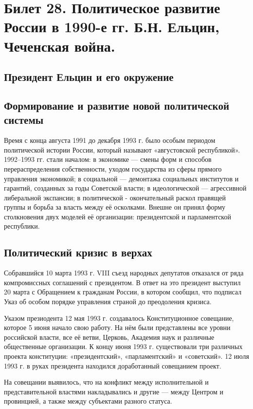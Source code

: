 \section{Билет 28. Политическое развитие России в 1990-е гг. Б.Н. Ельцин, Чеченская война.}

\subsection{Президент Ельцин и его окружение}

\subsection{Формирование и развитие новой политической системы}

Время с конца августа 1991 до декабря 1993 г. было особым периодом политической истории России, который называют «августовской республикой». 1992–1993 гг. стали началом: в экономике — смены форм и способов перераспределения собственности, уходом государства из сферы прямого управления экономикой; в социальной — демонтажа социальных институтов и гарантий, созданных за годы Советской власти; в идеологической — агрессивной либеральной экспансии; в политической - окончательный раскол правящей группы и борьба за власть между её осколками. Внешне он принял форму столкновения двух моделей её организации: президентской и парламентской республики.

\subsection{Политический кризис в верхах}

Собравшийся 10 марта 1993 г. VIII съезд народных депутатов отказался от ряда компромиссных соглашений с президентом. В ответ на это президент выступил 20 марта с Обращением к гражданам России, в котором сообщил, что подписал Указ об особом порядке управления страной до преодоления кризиса.

Указом презиодента 12 мая 1993 г. создавалось Конституционное совещание, которое 5 июня начало свою работу. На нём были представлены все уровни российской власти, все её ветви, Церковь, Академия наук и различные общественные организации. К концу июня 1993 г. существовали три различных проекта конституции: «президентский», «парламентский» и «советский». 12 июля 1993 г. в руках президента находился доработанный совещанием проект.

На совещании выявилось, что на конфликт между исполнительной и представительной властями накладывались и другие — между Центром и провинцией, а также между субъектами разного статуса.


